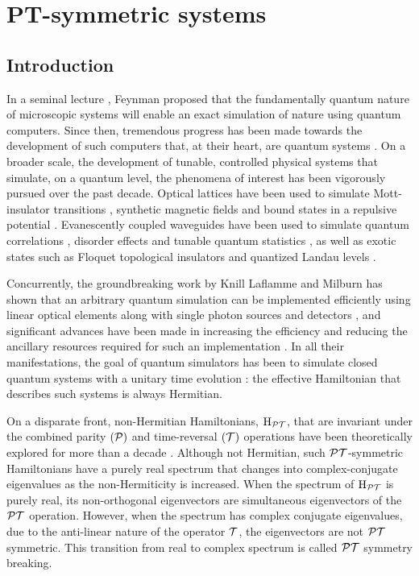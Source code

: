\section{PT-symmetric systems}
\label{sec:PT}
\subsection{Introduction}
In a seminal lecture \cite{qsim-feynman}, Feynman proposed that the
fundamentally quantum nature of microscopic systems will enable an exact
simulation of nature using quantum computers. Since then, tremendous progress
has been made towards the development of such computers that, at their heart,
are quantum systems \cite{qcomp-review}. On a broader scale, the
development of tunable, controlled physical systems that simulate, on a quantum
level, the phenomena of interest has been vigorously pursued over the past
decade. Optical lattices have been used to simulate Mott-insulator transitions
\cite{jordens-nature-455-204}, synthetic magnetic fields
\cite{lin-nature-462-628} and bound states in a repulsive potential
\cite{winkler-nature-441-853}. Evanescently coupled waveguides
\cite{garanovich-waveguides-2012} have been used to simulate quantum
correlations \cite{walks-peruzzo}, disorder effects
\cite{crespi-nphoton-7-322} and tunable quantum statistics
\cite{matthews-scirep-3-1539}, as well as exotic states such as Floquet
topological insulators \cite{rechtsman-nature-496-196,
khanikaev-natmater-12-233} and quantized Landau levels
\cite{rechtsman-nphoton-7-153}.

Concurrently, the groundbreaking work by Knill Laflamme and Milburn
\cite{klm} has shown that an arbitrary quantum simulation can be
implemented efficiently using linear optical elements along with single photon
sources and detectors \cite{kok-revmodphys-79-135}, and significant advances
have been made in increasing the efficiency and reducing the ancillary resources
required for such an implementation \cite{review-obrien,
obrien-natphoton-3-687}. In all their manifestations, the goal of quantum
simulators has been to simulate closed quantum systems with a unitary time
evolution \cite{cirac-natphys-8-264}: the effective Hamiltonian that describes
such systems is always Hermitian.

On a disparate front, non-Hermitian Hamiltonians, \(\mathrm{H}_{\mathcal{PT}}\), that are
invariant under the combined parity \((\mathcal{P})\) and time-reversal
\((\mathcal{T})\) operations have been theoretically explored for more than a
decade \cite{bender98, levai-jphysa-33-7165, bender07}. Although not Hermitian,
such \(\mathcal{PT}\)-symmetric
Hamiltonians have a purely real spectrum that changes into complex-conjugate
eigenvalues as the non-Hermiticity is increased. When the spectrum of
\(\mathrm{H}_{\mathcal{PT}}\) is purely real, its non-orthogonal eigenvectors are
simultaneous eigenvectors of the \(\mathcal{PT}\) operation. However, when the spectrum
has complex conjugate eigenvalues, due to the anti-linear nature of the operator
\(\mathcal{T}\), the eigenvectors are not \(\mathcal{PT}\) symmetric. This transition from
real to complex spectrum is called \(\mathcal{PT}\) symmetry breaking. 

